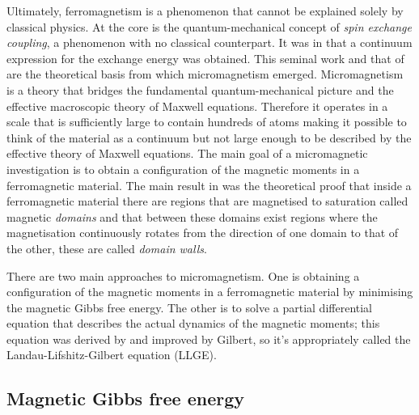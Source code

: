 Ultimately, ferromagnetism is a phenomenon that cannot be explained solely by classical physics. At the core is the quantum-mechanical concept of \textit{spin exchange coupling}, a phenomenon with no classical counterpart. It was in \citet{Landau} that a continuum expression for the exchange energy was obtained. This seminal work and that of \citet{Brown} are the theoretical basis from which micromagnetism emerged. Micromagnetism is a theory that bridges the fundamental quantum-mechanical picture and the effective macroscopic theory of Maxwell equations. Therefore it operates in a scale that is sufficiently large to contain hundreds of atoms making it possible to think of the material as a continuum but not large enough to be described by the effective theory of Maxwell equations. The main goal of a micromagnetic investigation is to obtain a configuration of the magnetic moments in a ferromagnetic material. The main result in \citet{Landau} was the theoretical proof that inside a ferromagnetic material there are regions that are magnetised to saturation called magnetic \textit{domains} and that between these domains exist regions where the magnetisation continuously rotates from the direction of one domain to that of the other, these are called \textit{domain walls}.\par

There are two main approaches to micromagnetism. One is obtaining a configuration of the magnetic moments in a ferromagnetic material by minimising the magnetic Gibbs free energy. The other is to solve a partial differential equation that describes the actual dynamics of the magnetic moments; this equation was derived by \citet{Landau} and improved by Gilbert, so it's appropriately called the Landau-Lifshitz-Gilbert equation (LLGE).\par

\subsection{Magnetic Gibbs free energy}

